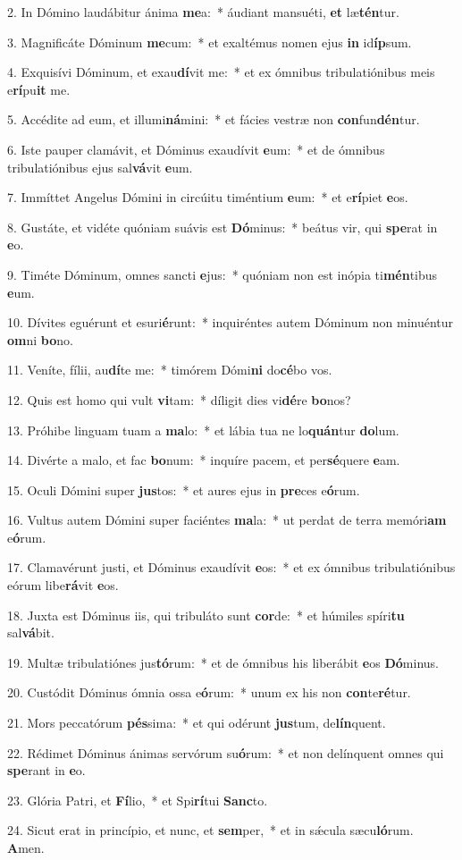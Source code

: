 2. In Dómino laudábitur ánima \textbf{me}a:~*  áudiant mansuéti, \textbf{et} læ\textbf{tén}tur.\

3. Magnificáte Dóminum \textbf{me}cum:~*  et exaltémus nomen ejus \textbf{in} id\textbf{íp}sum.\

4. Exquisívi Dóminum, et exau\textbf{dí}vit me:~*  et ex ómnibus tribulatiónibus meis e\textbf{rí}pu\textbf{it} me.\

5. Accédite ad eum, et illumi\textbf{ná}mini:~*  et fácies vestræ non \textbf{con}fun\textbf{dén}tur.\

6. Iste pauper clamávit, et Dóminus exaudívit \textbf{e}um:~*  et de ómnibus tribulatiónibus ejus sal\textbf{vá}vit \textbf{e}um.\

7. Immíttet Angelus Dómini in circúitu timéntium \textbf{e}um:~*  et e\textbf{rí}piet \textbf{e}os.\

8. Gustáte, et vidéte quóniam suávis est \textbf{Dó}minus:~*  beátus vir, qui \textbf{spe}rat in \textbf{e}o.\

9. Timéte Dóminum, omnes sancti \textbf{e}jus:~*  quóniam non est inópia ti\textbf{mén}tibus \textbf{e}um.\

10. Dívites eguérunt et esuri\textbf{é}runt:~*  inquiréntes autem Dóminum non minuéntur \textbf{om}ni \textbf{bo}no.\

11. Veníte, fílii, au\textbf{dí}te me:~*  timórem Dómi\textbf{ni} do\textbf{cé}bo vos.\

12. Quis est homo qui vult \textbf{vi}tam:~*  díligit dies vi\textbf{dé}re \textbf{bo}nos?\

13. Próhibe linguam tuam a \textbf{ma}lo:~*  et lábia tua ne lo\textbf{quán}tur \textbf{do}lum.\

14. Divérte a malo, et fac \textbf{bo}num:~*  inquíre pacem, et per\textbf{sé}quere \textbf{e}am.\

15. Oculi Dómini super \textbf{jus}tos:~*  et aures ejus in \textbf{pre}ces e\textbf{ó}rum.\

16. Vultus autem Dómini super faciéntes \textbf{ma}la:~*  ut perdat de terra memóri\textbf{am} e\textbf{ó}rum.\

17. Clamavérunt justi, et Dóminus exaudívit \textbf{e}os:~*  et ex ómnibus tribulatiónibus eórum libe\textbf{rá}vit \textbf{e}os.\

18. Juxta est Dóminus iis, qui tribuláto sunt \textbf{cor}de:~*  et húmiles spíri\textbf{tu} sal\textbf{vá}bit.\

19. Multæ tribulatiónes jus\textbf{tó}rum:~*  et de ómnibus his liberábit \textbf{e}os \textbf{Dó}minus.\

20. Custódit Dóminus ómnia ossa e\textbf{ó}rum:~*  unum ex his non \textbf{con}te\textbf{ré}tur.\

21. Mors peccatórum \textbf{pés}sima:~*  et qui odérunt \textbf{jus}tum, de\textbf{lín}quent.\

22. Rédimet Dóminus ánimas servórum su\textbf{ó}rum:~*  et non delínquent omnes qui \textbf{spe}rant in \textbf{e}o.\

23. Glória Patri, et \textbf{Fí}lio,~*  et Spi\textbf{rí}tui \textbf{Sanc}to.\

24. Sicut erat in princípio, et nunc, et \textbf{sem}per,~*  et in sǽcula sæcu\textbf{ló}rum. \textbf{A}men.\

